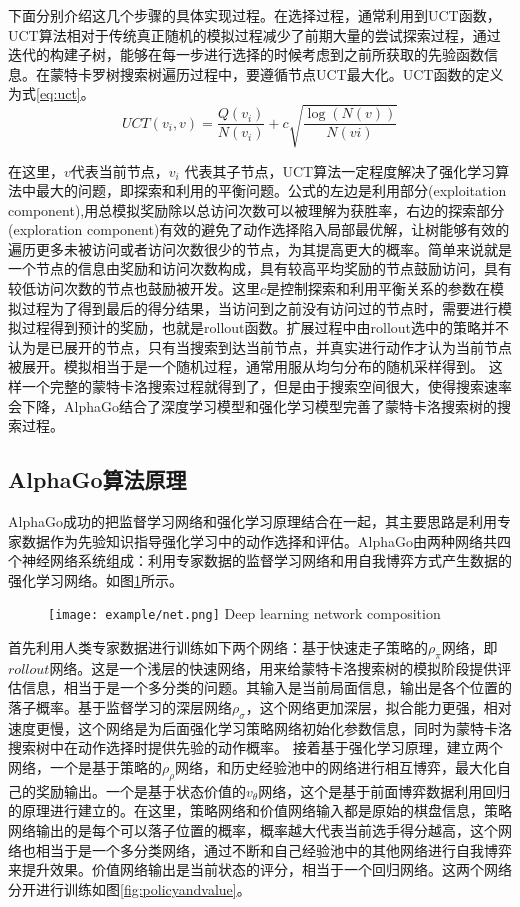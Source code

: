 下面分别介绍这几个步骤的具体实现过程。在选择过程，通常利用到UCT函数，UCT算法相对于传统真正随机的模拟过程减少了前期大量的尝试探索过程，通过迭代的构建子树，能够在每一步进行选择的时候考虑到之前所获取的先验函数信息。在蒙特卡罗树搜索树遍历过程中，要遵循节点UCT最大化。UCT函数的定义为式\ref{eq:uct}。
\begin{equation}
\label{eq:uct}
UCT({v_i},v) = \frac{{Q({v_i})}}{{N({v_i})}} + c\sqrt {\frac{{\log (N(v))}}{{N(vi)}}} 
\end{equation}

在这里，$v$代表当前节点，$ v_i$ 代表其子节点，UCT算法一定程度解决了强化学习算法中最大的问题，即探索和利用的平衡问题。公式的左边是利用部分(exploitation component),用总模拟奖励除以总访问次数可以被理解为获胜率，右边的探索部分(exploration component)有效的避免了动作选择陷入局部最优解，让树能够有效的遍历更多未被访问或者访问次数很少的节点，为其提高更大的概率。简单来说就是一个节点的信息由奖励和访问次数构成，具有较高平均奖励的节点鼓励访问，具有较低访问次数的节点也鼓励被开发。这里$c$是控制探索和利用平衡关系的参数在模拟过程为了得到最后的得分结果，当访问到之前没有访问过的节点时，需要进行模拟过程得到预计的奖励，也就是rollout函数。扩展过程中由rollout选中的策略并不认为是已展开的节点，只有当搜索到达当前节点，并真实进行动作才认为当前节点被展开。模拟相当于是一个随机过程，通常用服从均匀分布的随机采样得到。
这样一个完整的蒙特卡洛搜索过程就得到了，但是由于搜索空间很大，使得搜索速率会下降，AlphaGo结合了深度学习模型和强化学习模型完善了蒙特卡洛搜索树的搜索过程。

\subsection{AlphaGo算法原理}
AlphaGo成功的把监督学习网络和强化学习原理结合在一起，其主要思路是利用专家数据作为先验知识指导强化学习中的动作选择和评估。AlphaGo由两种网络共四个神经网络系统组成：利用专家数据的监督学习网络和用自我博弈方式产生数据的强化学习网络。如图\ref{fig:net}所示。

\begin{figure}[htbp]
	\centering
	\texttt{[image: example/net.png]}
	{Deep learning network composition}
	\label{fig:net}
\end{figure}

首先利用人类专家数据进行训练如下两个网络：基于快速走子策略的${\rho _\pi }$网络，即$roll out$网络。这是一个浅层的快速网络，用来给蒙特卡洛搜索树的模拟阶段提供评估信息，相当于是一个多分类的问题。其输入是当前局面信息，输出是各个位置的落子概率。基于监督学习的深层网络${\rho _\sigma }$，这个网络更加深层，拟合能力更强，相对速度更慢，这个网络是为后面强化学习策略网络初始化参数信息，同时为蒙特卡洛搜索树中在动作选择时提供先验的动作概率。
接着基于强化学习原理，建立两个网络，一个是基于策略的${\rho _\rho }$网络，和历史经验池中的网络进行相互博弈，最大化自己的奖励输出。一个是基于状态价值的${v_\theta }$网络，这个是基于前面博弈数据利用回归的原理进行建立的。在这里，策略网络和价值网络输入都是原始的棋盘信息，策略网络输出的是每个可以落子位置的概率，概率越大代表当前选手得分越高，这个网络也相当于是一个多分类网络，通过不断和自己经验池中的其他网络进行自我博弈来提升效果。价值网络输出是当前状态的评分，相当于一个回归网络。这两个网络分开进行训练如图\ref{fig:policyandvalue}。

